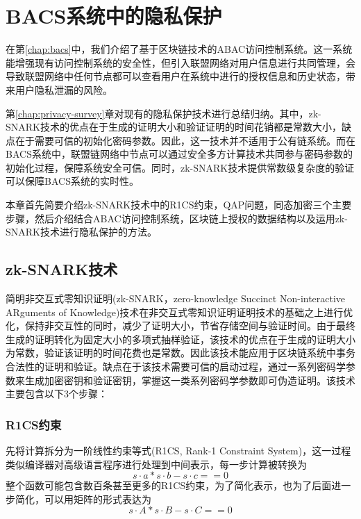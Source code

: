 
\chapter{BACS系统中的隐私保护}
\label{chap:privacy-design}

在第\ref{chap:bacs}中，我们介绍了基于区块链技术的ABAC访问控制系统。这一系统能增强现有访问控制系统的安全性，但引入联盟网络对用户信息进行共同管理，会导致联盟网络中任何节点都可以查看用户在系统中进行的授权信息和历史状态，带来用户隐私泄漏的风险。

第\ref{chap:privacy-survey}章对现有的隐私保护技术进行总结归纳。其中，zk-SNARK技术的优点在于生成的证明大小和验证证明的时间花销都是常数大小，缺点在于需要可信的初始化密码参数。因此，这一技术并不适用于公有链系统。而在BACS系统中，联盟链网络中节点可以通过安全多方计算技术共同参与密码参数的初始化过程，保障系统安全可信。同时，zk-SNARK技术提供常数级复杂度的验证可以保障BACS系统的实时性。

本章首先简要介绍zk-SNARK技术中的R1CS约束，QAP问题，同态加密三个主要步骤，然后介绍结合ABAC访问控制系统，区块链上授权的数据结构以及运用zk-SNARK技术进行隐私保护的方法。

\section{zk-SNARK技术}
\label{sec:zk-SNARK}

简明非交互式零知识证明(zk-SNARK，zero-knowledge Succinct Non-interactive ARguments of Knowledge)技术在非交互式零知识证明证明技术的基础之上进行优化，保持非交互性的同时，减少了证明大小，节省存储空间与验证时间。由于最终生成的证明转化为固定大小的多项式抽样验证，该技术的优点在于生成的证明大小为常数，验证该证明的时间花费也是常数。因此该技术能应用于区块链系统中事务合法性的证明和验证。缺点在于该技术需要可信的启动过程，通过一系列密码学参数来生成加密密钥和验证密钥，掌握这一类系列密码学参数即可伪造证明。该技术主要包含以下3个步骤：

\subsection{R1CS约束}

先将计算拆分为一阶线性约束等式(R1CS, Rank-1 Constraint System)，这一过程类似编译器对高级语言程序进行处理到中间表示，每一步计算被转换为
$$s \cdot a * s \cdot b - s \cdot c == 0$$整个函数可能包含数百条甚至更多的R1CS约束，为了简化表示，也为了后面进一步简化，可以用矩阵的形式表达为
$$s \cdot A * s \cdot B - s \cdot C == 0$$

